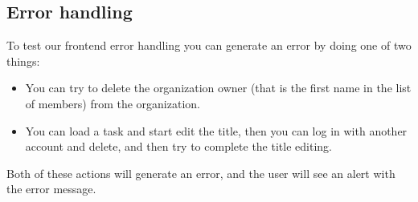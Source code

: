 \documentclass{article}
\begin{document}
\subsection{Error handling}

To test our frontend error handling you can generate an error by doing one of two things:
\begin{itemize}
  \item You can try to delete the organization owner (that is the first name in the list of members) from the organization.
  \item You can load a task and start edit the title, then you can log in with another account and delete, and then try to complete 
  the title editing.
\end {itemize}

Both of these actions will generate an error, and the user will see an alert with the error message.
\end{document}
